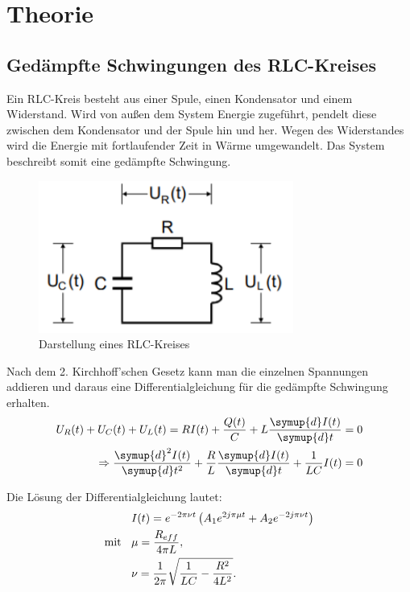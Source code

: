 \section{Theorie}
\label{sec:Theorie}

\subsection{Gedämpfte Schwingungen des RLC-Kreises}
Ein RLC-Kreis besteht aus einer Spule, einen Kondensator und einem Widerstand. Wird von außen
dem System Energie zugeführt, pendelt diese zwischen dem Kondensator und der Spule hin und her.
Wegen des Widerstandes wird die Energie mit fortlaufender Zeit in Wärme umgewandelt. Das System beschreibt
somit eine gedämpfte Schwingung.

\begin{figure}[H]
  \centering
  \includegraphics[height=5cm]{RLC-Kreis(Grundsaetzlich).PNG}
  \caption{Darstellung eines RLC-Kreises}
  \label{fig:RLC-Kreis(mit Widerstand)}
\end{figure}

Nach dem 2. Kirchhoff'schen Gesetz kann man die einzelnen Spannungen addieren und daraus eine Differentialgleichung
für die gedämpfte Schwingung erhalten.
\begin{align}
  U_R(t) + U_C(t) + U_L(t) = RI(t) +\frac{Q(t)}{C} + L\frac{\symup{d}I(t)}{\symup{d}t} = 0 \\
  \Rightarrow \frac{\symup{d}^2I(t)}{\symup{d}t^2} +\frac{R}{L}\frac{\symup{d}I(t)}{\symup{d}t} + \frac{1}{LC}I(t) = 0
\end{align}

Die Lösung der Differentialgleichung lautet:
\begin{align}
  &I(t) = e^{-2\pi \nu t} \left(A_1 e^{2j\pi \mu t} + A_2 e^{-2j\pi \nu t}\right)   \\
\text{mit} \:\:\:\:  &\mu = \frac{R_{eff}}{4\pi L} , \\
  &\nu = \frac{1}{2\pi} \sqrt{\frac{1}{LC} - \frac{R^2}{4L^2}} \notag.
\end{align}

